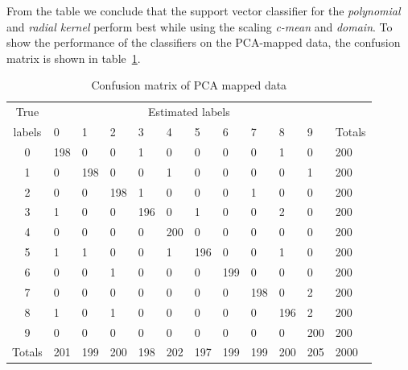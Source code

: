 \documentclass{article}
\begin{document}
From the table we conclude that the support vector classifier for the \textit{polynomial} and \textit{radial kernel} perform best while using the scaling \textit{c-mean} and \textit{domain}. To show the performance of the classifiers on the PCA-mapped data, the confusion matrix is shown in table~\ref{table: confusion matrix of PCA mapped data}.

\begin{table}[H]
  \centering
    \begin{tabular}{|c|llllllllll|l|}
    \hline
    \multicolumn{1}{|c|}{True} & \multicolumn{10}{c|}{Estimated labels} & \\
    labels & 0     & 1     & 2     & 3     & 4     & 5     & 6     & 7     & 8     & 9     & Totals \\
    \hline
    0     & 198   & 0     & 0     & 1     & 0     & 0     & 0     & 0     & 1     & 0     & 200 \\
    1     & 0     & 198   & 0     & 0     & 1     & 0     & 0     & 0     & 0     & 1     & 200 \\
    2     & 0     & 0     & 198   & 1     & 0     & 0     & 0     & 1     & 0     & 0     & 200 \\
    3     & 1     & 0     & 0     & 196   & 0     & 1     & 0     & 0     & 2     & 0     & 200 \\
    4     & 0     & 0     & 0     & 0     & 200   & 0     & 0     & 0     & 0     & 0     & 200 \\
    5     & 1     & 1     & 0     & 0     & 1     & 196   & 0     & 0     & 1     & 0     & 200 \\
    6     & 0     & 0     & 1     & 0     & 0     & 0     & 199   & 0     & 0     & 0     & 200 \\
    7     & 0     & 0     & 0     & 0     & 0     & 0     & 0     & 198   & 0     & 2     & 200 \\
    8     & 1     & 0     & 1     & 0     & 0     & 0     & 0     & 0     & 196   & 2     & 200 \\
    9     & 0     & 0     & 0     & 0     & 0     & 0     & 0     & 0     & 0     & 200   & 200 \\
    \hline
    Totals & 201   & 199   & 200   & 198   & 202   & 197   & 199   & 199   & 200   & 205   & 2000 \\
    \hline
    \end{tabular}%
  \caption{Confusion matrix of PCA mapped data} \label{table: confusion matrix of PCA mapped data}%
\end{table}%
\end{document}
